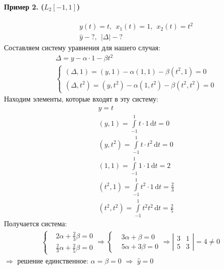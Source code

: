 \documentclass{article}[12pt]
\renewcommand{\d}{\,\mathrm{d}}
\begin{document}
\paragraph{Пример 2. ($L_{2}[-1,1]$)}
\begin{eqnarray*}
    &&y(t)=t,\ \ x_{1}(t)=1,\ \ x_{2}(t)=t^{2}\\
    &&\hat{y}-?,\ \ |\Delta| -?
\end{eqnarray*}
Составляем систему уравнения для нашего случая:
\begin{eqnarray*}
    &&\Delta=y-\alpha\cdot 1-\beta t^{2}\\
    &&\left\{\begin{aligned}
    (\Delta,1)=(y,1)-\alpha(1,1)-\beta(t^{2},1)=0\\
    (\Delta,t^{2})=(y,t^{2})-\alpha(1,t^{2})-\beta(t^{2},t^{2})=0
    \end{aligned} \right.
\end{eqnarray*}
Находим элементы, которые входят в эту систему:
\begin{eqnarray*}
&&y=t\\
&&(y,1)=\int\limits_{-1}^{1}t\cdot 1\d{t}=0\\
&&(y,t^{2})=\int\limits_{-1}^{1}t\cdot t^{2}\d{t}=0\\
&&(1,1)=\int\limits_{-1}^{1}1\cdot 1\d{t}=2\\
&&(t^{2},1)=\int\limits_{-1}^{1}t^{2}\cdot 1\d{t}
=\frac{2}{3}\\
&&(t^{2},t^{2})=\int\limits_{-1}^{1}t^{2}t^{2}\d{t}=\frac{2}{5}
\end{eqnarray*}
Получается система:
\begin{eqnarray*}
    \left\{\begin{aligned}
    &2\alpha+\frac{2}{3}\beta=0\\
    &\frac{2}{3}\alpha+\frac{2}{5}\beta=0
    \end{aligned} \right.
    \Rightarrow \left\{\begin{aligned}
            &3\alpha+\beta=0 \\ &5\alpha + 3\beta=0
    \end{aligned} \right.
    \Rightarrow \left|\begin{array}{cc}
            3 & 1\\5&3
    \end{array} \right|=4\neq 0
\end{eqnarray*}
$\Rightarrow $ решение единственное: $\alpha=\beta=0$ $\Rightarrow $
$\hat{y}=0$
\end{document}
